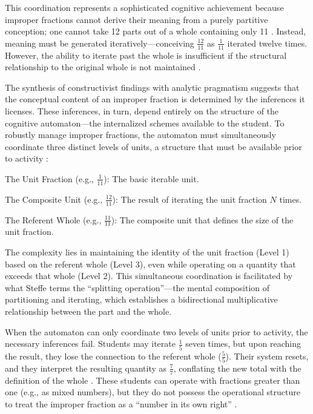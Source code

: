 \documentclass[12pt]{book}
\begin{document}
This coordination represents a sophisticated cognitive achievement because improper fractions cannot derive their meaning from a purely partitive conception; one cannot take 12 parts out of a whole containing only 11 \parencite{steffe2002new}. Instead, meaning must be generated iteratively—conceiving $\frac{12}{11}$ as $\frac{1}{11}$ iterated twelve times. However, the ability to iterate past the whole is insufficient if the structural relationship to the original whole is not maintained \parencite{Hackenberg:2007aa}.

The synthesis of constructivist findings with analytic pragmatism suggests that the conceptual content of an improper fraction is determined by the inferences it licenses. These inferences, in turn, depend entirely on the structure of the cognitive automaton---the internalized schemes available to the student. To robustly manage improper fractions, the automaton must simultaneously coordinate three distinct levels of units, a structure that must be available prior to activity \parencite{Hackenberg:2007aa}:

The Unit Fraction (e.g., $\frac{1}{11}$): The basic iterable unit.

The Composite Unit (e.g., $\frac{12}{11}$): The result of iterating the unit fraction $N$ times.

The Referent Whole (e.g., $\frac{11}{11}$): The composite unit that defines the size of the unit fraction.

The complexity lies in maintaining the identity of the unit fraction (Level 1) based on the referent whole (Level 3), even while operating on a quantity that exceeds that whole (Level 2). This simultaneous coordination is facilitated by what Steffe \parencite*{steffe2002new} terms the ``splitting operation''---the mental composition of partitioning and iterating, which establishes a bidirectional multiplicative relationship between the part and the whole.

When the automaton can only coordinate two levels of units prior to activity, the necessary inferences fail. Students may iterate $\frac{1}{5}$ seven times, but upon reaching the result, they lose the connection to the referent whole ($\frac{5}{5}$). Their system resets, and they interpret the resulting quantity as $\frac{7}{7}$, conflating the new total with the definition of the whole \parencite[287]{steffe2002new}. These students can operate with fractions greater than one (e.g., as mixed numbers), but they do not possess the operational structure to treat the improper fraction as a ``number in its own right'' \parencite[27]{Hackenberg:2007aa}.
\end{document}
